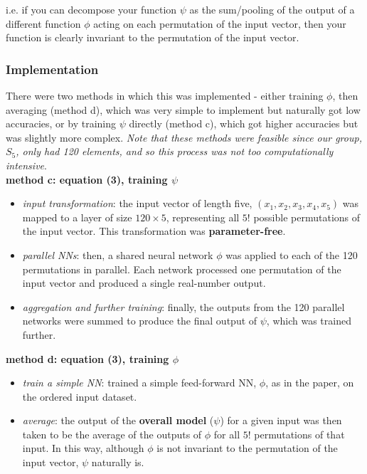 \documentclass{article}
\begin{document}
\indent i.e. if you can decompose your function $\psi$ as the sum/pooling of the output of a different function $\phi$ acting on each permutation of the input vector, then your function is clearly invariant to the permutation of the input vector.

\subsubsection{Implementation}

There were two methods in which this was implemented - either training $\phi$, then averaging (method d), which was very simple to implement but naturally got low accuracies, or by training $\psi$ directly (method c), which got higher accuracies but was slightly more complex. \emph{Note that these methods were feasible since our group, $S_5$, only had 120 elements, and so this process was not too computationally intensive}. \\

\noindent \textbf{method c: equation (3), training $\psi$}

\begin{itemize}
        \item \emph{input transformation}: the input vector of length five, $(x_1, x_2, x_3, x_4, x_5)$ was mapped to a layer of size $120 \times 5$, representing all $5!$ possible permutations of the input vector. This transformation was \textbf{parameter-free}.
        \item \emph{parallel NNs}: then, a shared neural network $\phi$ was applied to each of the 120 permutations in parallel. Each network processed one permutation of the input vector and produced a single real-number output.
        \item \emph{aggregation and further training}: finally, the outputs from the 120 parallel networks were summed to produce the final output of $\psi$, which was trained further.
\end{itemize}

\noindent \textbf{method d: equation (3), training $\phi$}
\begin{itemize}
    \item \emph{train a simple NN}: trained a simple feed-forward NN, $\phi$, as in the paper, on the ordered input dataset.
    \item \emph{average}: the output of the \textbf{overall model} ($\psi$) for a given input was then taken to be the average of the outputs of $\phi$ for all $5!$ permutations of that input. In this way, although $\phi$ is not invariant to the permutation of the input vector, $\psi$ naturally is.
\end{itemize} 
\end{document}
